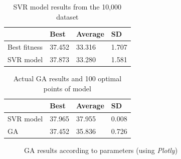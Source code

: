   \begin{table}[t]
    \centering
    \caption{SVR model results from the 10,000 dataset}
    \label{tab:1}
    \vspace{-0.5em}
    \small
    \begin{tabu}{X[l] || X[r] X[r] X[r]}
      \toprule
      & Best & Average & SD\footnotemark \\
      \hline\hline
      Best fitness & 37.452 & 33.316 & 1.707 \\
      SVR model & 37.873 & 33.280 & 1.581 \\
      \bottomrule
    \end{tabu}
  \end{table}

  \begin{table}[t]
    \centering
    \caption{Actual GA results and 100 optimal points of model}
    \label{tab:2}
    \vspace{-0.5em}
    \small
    \begin{tabu}{X[l] || X[r] X[r] X[r]}
      \toprule
      & Best & Average & SD \\
      \hline\hline
      SVR model & 37.965 & 37.955 & 0.008 \\
      GA & 37.452 & 35.836 & 0.726 \\
      \bottomrule
    \end{tabu}
  \end{table}

  \begin{figure}[t]
      \centering
    \caption{GA results according to parameters (using \textit{Plotly})}
    \label{fig:2}
  \end{figure}


